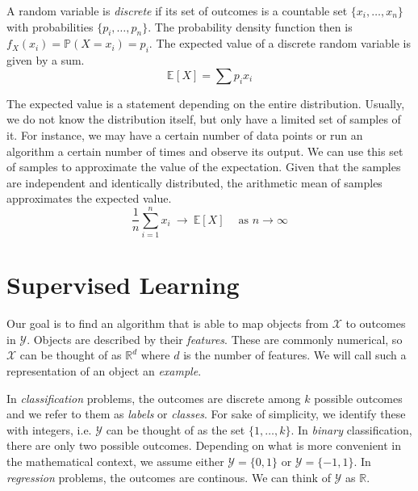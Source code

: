 \documentclass[
	twoside=false, %
]{kaobook}
\begin{document}
A random variable is \textit{discrete} if its set of outcomes is a countable set $\{ x_{i}, \dots, x_{n} \}$ with probabilities $\{ p_{i}, \dots, p_{n} \}$. The probability density function then is $f_X(x_i) = \mathbb{P}(X = x_i) = p_i$. The expected value of a discrete random variable is given by a sum.
$$
\mathbb{E}_{}\left[ X \right]  = \sum p_{i} x_{i}
$$

The expected value is a statement depending on the entire distribution. Usually, we do not know the distribution itself, but only have a limited set of samples of it. For instance, we may have a certain number of data points or run an algorithm a certain number of times and observe its output. We can use this set of samples to approximate the value of the expectation. Given that the samples are independent and identically distributed, the arithmetic mean of samples approximates the expected value.
$$
\frac{1}{n} \sum_{i=1}^n x_i ~ \rightarrow ~ \mathbb{E}\left[X\right]  ~ \hspace{1em} \text{as $n \to \infty$}
$$


\section{Supervised Learning}
\label{sec:supervised-learning}

Our goal is to find an algorithm that is able to map objects from $\mathcal{X}$ to outcomes in $\mathcal{Y}$. Objects
are described by their \textit{features}. These are commonly numerical, so $\mathcal{X}$ can be thought of as $\mathbb{R}^d$ where $d$ is the number of features. We will call such a representation of an object an \textit{example}.

In \textit{classification} problems, the outcomes are discrete among $k$ possible outcomes and we refer to them as \textit{labels} or \textit{classes}. For sake of simplicity, we identify these with integers, i.e. $\mathcal{Y}$ can be thought of as the set $\{ 1, \dots, k \}$. In \textit{binary} classification, there are only two possible outcomes. Depending on what is more convenient in the mathematical context, we assume either $\mathcal{Y} = \{0,1\}$ or $\mathcal{Y} = \{-1, 1\}$.
In \textit{regression} problems, the outcomes are continous. We can think of $\mathcal{Y}$ as $\mathbb{R}$.
\end{document}
